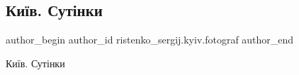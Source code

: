  
 
 
 
 

\subsection{Київ. Сутінки}
\label{sec:20_11_2022.fb.ristenko_sergij.kyiv.fotograf.1.ki_v__sut_nki}

\ifcmt
 author_begin
   author_id ristenko_sergij.kyiv.fotograf
 author_end
\fi

Київ. Сутінки
